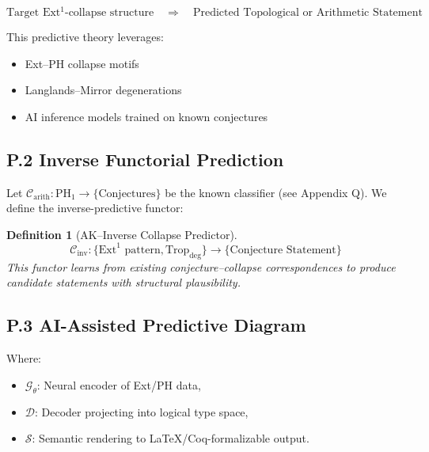 \documentclass[11pt]{article}
\newtheorem{definition}[theorem]{Definition}
\begin{document}
\[
\boxed{
\text{Target Ext$^1$-collapse structure}
\quad \Rightarrow \quad
\text{Predicted Topological or Arithmetic Statement}
}
\]

This predictive theory leverages:
\begin{itemize}
  \item Ext–PH collapse motifs
  \item Langlands–Mirror degenerations
  \item AI inference models trained on known conjectures
\end{itemize}

\subsection*{P.2 Inverse Functorial Prediction}

Let \( \mathscr{C}_{\mathrm{arith}}: \mathrm{PH}_1 \to \{ \text{Conjectures} \} \) be the known classifier (see Appendix Q).  
We define the inverse-predictive functor:

\begin{definition}[AK–Inverse Collapse Predictor]
\[
\mathscr{C}_{\mathrm{inv}}: \{ \mathrm{Ext}^1 \text{ pattern}, \mathrm{Trop}_{\mathrm{deg}} \} \to \{ \text{Conjecture Statement} \}
\]
This functor learns from existing conjecture–collapse correspondences to produce candidate statements with structural plausibility.
\end{definition}

\subsection*{P.3 AI-Assisted Predictive Diagram}

\vspace{1em}
\begin{center}
\end{center}
\vspace{1em}

Where:
\begin{itemize}
  \item \( \mathcal{G}_\theta \): Neural encoder of Ext/PH data,
  \item \( \mathcal{D} \): Decoder projecting into logical type space,
  \item \( \mathcal{S} \): Semantic rendering to LaTeX/Coq-formalizable output.
\end{itemize}
\end{document}
